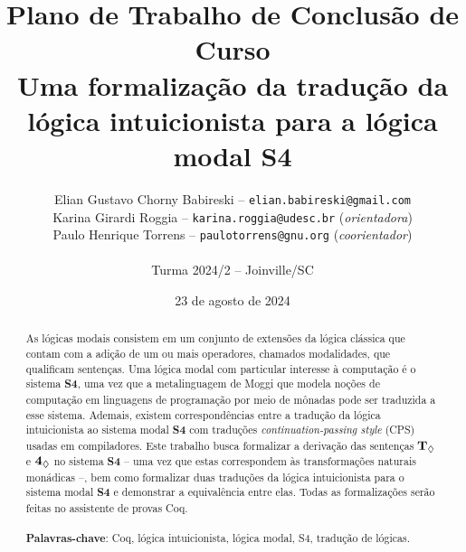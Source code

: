\title{
Plano de Trabalho de Conclusão de Curso\\
Uma formalização da tradução da lógica intuicionista para a lógica modal S4
}

\author{
Elian Gustavo Chorny Babireski -- \texttt{elian.babireski@gmail.com}\\
Karina Girardi Roggia -- \texttt{karina.roggia@udesc.br} {(\textit{orientadora})}\\
Paulo Henrique Torrens -- \texttt{paulotorrens@gnu.org} {(\textit{coorientador})}\\
~\\
Turma 2024/2 -- Joinville/SC
}

\date{23 de agosto de 2024}

\maketitle

\onehalfspacing  %

\begin{abstract}
As lógicas modais consistem em um conjunto de extensões da lógica clássica que contam com a adição de um ou mais operadores, chamados modalidades, que qualificam sentenças. Uma lógica modal com particular interesse à computação é o sistema \textbf{S4}, uma vez que a metalinguagem de Moggi que modela noções de computação em linguagens de programação por meio de mônadas pode ser traduzida a esse sistema. Ademais, existem correspondências entre a tradução da lógica intuicionista ao sistema modal \textbf{S4} com traduções \textit{continuation-passing style} (CPS) usadas em compiladores. Este trabalho busca formalizar a derivação das sentenças $\boldsymbol{\text{\textbf{T}}_\Diamond}$ e $\boldsymbol{\text{\textbf{4}}_\Diamond}$ no sistema \textbf{S4} -- uma vez que estas correspondem às transformações naturais monádicas --, bem como formalizar duas traduções da lógica intuicionista para o sistema modal \textbf{S4} e demonstrar a equivalência entre elas. Todas as formalizações serão feitas no assistente de provas Coq. \\\\
\textbf{Palavras-chave}: Coq, lógica intuicionista, lógica modal, S4, tradução de lógicas.
\end{abstract}